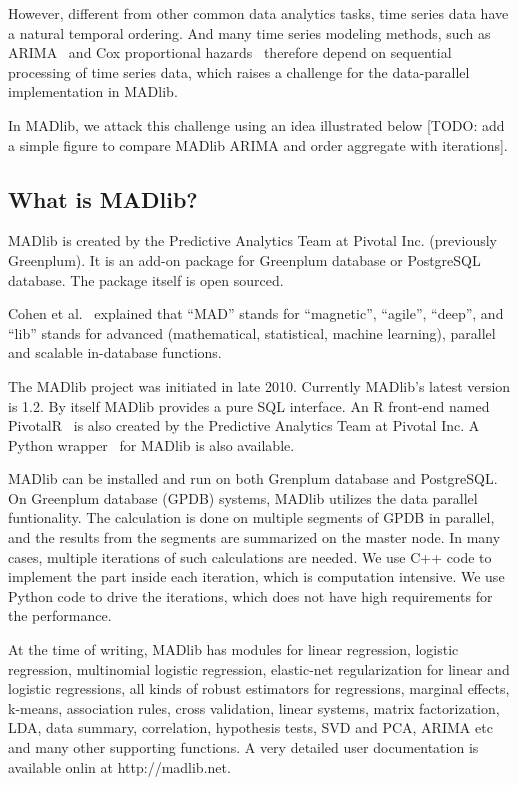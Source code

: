 \documentclass[english,12pt]{article}
\begin{document}
However, different from other common data analytics tasks, time series data have a natural temporal ordering.
And many time series modeling methods, such as ARIMA~\cite{arima} and Cox proportional hazards~\cite{cox} therefore depend on sequential processing of time series data, which raises a challenge for the data-parallel implementation in MADlib.

In MADlib, we attack this challenge using an idea illustrated below [TODO: add a simple figure to compare MADlib ARIMA and order aggregate with iterations].


\subsection{What is MADlib?}


MADlib is created by the Predictive Analytics Team at Pivotal Inc. (previously
Greenplum). It is an add-on package for Greenplum database or PostgreSQL
database. The package itself is open sourced.

Cohen et al.~\cite{mad-skills} explained that ``MAD'' stands for ``magnetic'',
``agile'', ``deep'', and ``lib'' stands for advanced (mathematical, statistical,
machine learning), parallel and scalable in-database functions.

The MADlib project was initiated in late 2010. Currently MADlib's latest
version is 1.2. By itself MADlib provides a pure SQL interface. An R front-end
named PivotalR~\cite{pivotalr} is also created by the Predictive Analytics Team
at Pivotal Inc. A Python wrapper~\cite{python-madlib} for MADlib is also
available.

MADlib can be installed and run on both Grenplum database and PostgreSQL\@. On
Greenplum database (GPDB) systems, MADlib utilizes the data parallel
funtionality. The calculation is done on multiple segments of GPDB in parallel,
and the results from the segments are summarized on the master node. In many
cases, multiple iterations of such calculations are needed. We use C++ code to
implement the part inside each iteration, which is computation intensive. We
use Python code to drive the iterations, which does not have high requirements
for the performance.



At the time of writing, MADlib has modules for linear regression, logistic
regression, multinomial logistic regression, elastic-net regularization for
linear and logistic regressions, all kinds of robust estimators for
regressions, marginal effects, k-means, association rules, cross validation,
linear systems, matrix factorization, LDA, data summary, correlation,
hypothesis tests, SVD and PCA, ARIMA etc and many other supporting functions.
A very detailed user documentation is available onlin at
http://madlib.net.
\end{document}
